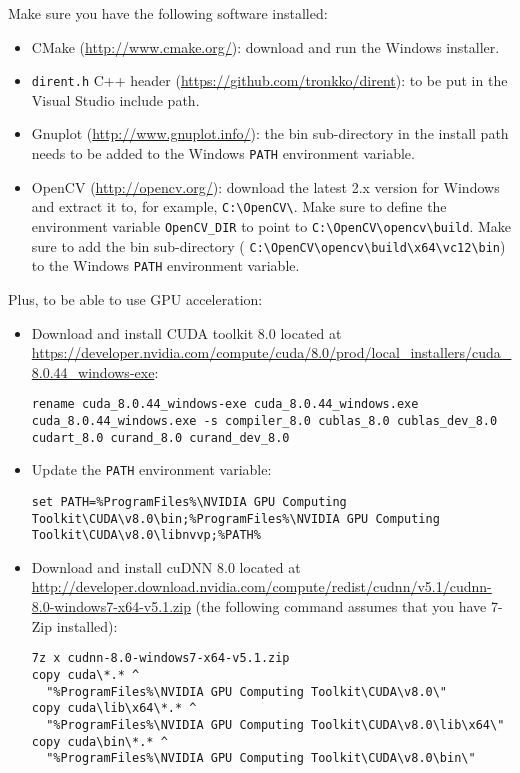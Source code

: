 \documentclass[a4paper,11pt,oneside]{article}
\newenvironment{myitemize}
{ \begin{itemize}
    \setlength{\itemsep}{0pt}
    \setlength{\parskip}{0pt}
    \setlength{\parsep}{0pt}     }
{ \end{itemize}                  }
\begin{document}
Make sure you have the following software installed:
\begin{myitemize}
    \item CMake (\url{http://www.cmake.org/}): download and run the Windows installer.
    \item \lstinline!dirent.h! C++ header (\url{https://github.com/tronkko/dirent}): to be put in the Visual Studio
    include path.
    \item Gnuplot (\url{http://www.gnuplot.info/}): the bin sub-directory in
    the install path needs to be added to the Windows \lstinline!PATH!
     environment variable.
    \item OpenCV (\url{http://opencv.org/}): download the latest 2.x version
    for Windows and extract it to, for example,
    \lstinline!C:\OpenCV\!.
  Make sure to define the environment variable \lstinline!OpenCV_DIR! to point
  to \lstinline!C:\OpenCV\opencv\build!.
  Make sure to add the bin sub-directory (%
\lstinline!C:\OpenCV\opencv\build\x64\vc12\bin!) to the Windows
  \lstinline!PATH! environment variable.
\end{myitemize}

Plus, to be able to use GPU acceleration:
\begin{myitemize}
    \item Download and install CUDA toolkit 8.0 located at \url{https://developer.nvidia.com/compute/cuda/8.0/prod/local_installers/cuda_8.0.44_windows-exe}:
\begin{lstlisting}[escapechar=!]
rename cuda_8.0.44_windows-exe cuda_8.0.44_windows.exe
cuda_8.0.44_windows.exe -s compiler_8.0 cublas_8.0 cublas_dev_8.0 cudart_8.0 curand_8.0 curand_dev_8.0
\end{lstlisting}
    \item Update the \lstinline!PATH! environment variable:
\begin{lstlisting}[escapechar=!]
set PATH=%ProgramFiles%\NVIDIA GPU Computing Toolkit\CUDA\v8.0\bin;%ProgramFiles%\NVIDIA GPU Computing Toolkit\CUDA\v8.0\libnvvp;%PATH%
\end{lstlisting}
    \item Download and install cuDNN 8.0 located at \url{http://developer.download.nvidia.com/compute/redist/cudnn/v5.1/cudnn-8.0-windows7-x64-v5.1.zip} (the following command assumes that you have 7-Zip installed):
\begin{lstlisting}[escapechar=!]
7z x cudnn-8.0-windows7-x64-v5.1.zip
copy cuda\*.* ^
  "%ProgramFiles%\NVIDIA GPU Computing Toolkit\CUDA\v8.0\"
copy cuda\lib\x64\*.* ^
  "%ProgramFiles%\NVIDIA GPU Computing Toolkit\CUDA\v8.0\lib\x64\"
copy cuda\bin\*.* ^
  "%ProgramFiles%\NVIDIA GPU Computing Toolkit\CUDA\v8.0\bin\"
\end{lstlisting}
\end{myitemize}
\end{document}

